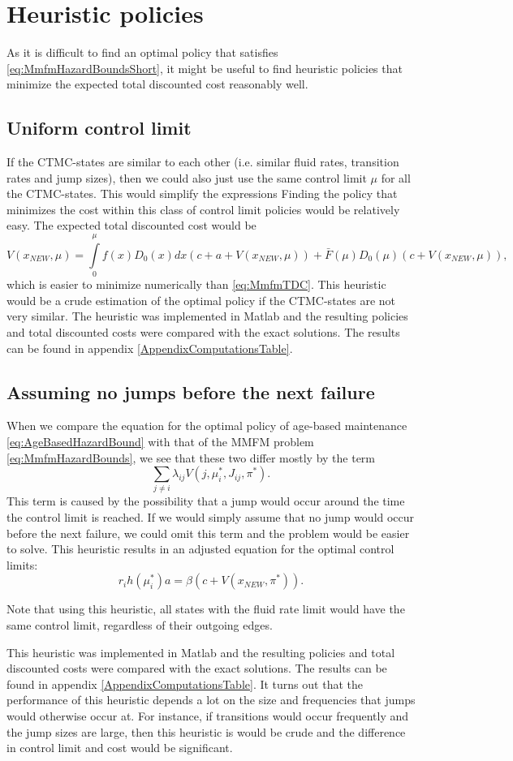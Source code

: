 \section{Heuristic policies}\label{section:MmfmHeuristics}
As it is difficult to find an optimal policy that satisfies \eqref{eq:MmfmHazardBoundsShort}, it might be useful to find heuristic policies that minimize the expected total discounted cost reasonably well.

\subsection{Uniform control limit}
If the CTMC-states are similar to each other (i.e. similar fluid rates, transition rates and jump sizes), then we could also just use the same control limit $\mu$ for all the CTMC-states.
This would simplify the expressions 
Finding the policy that minimizes the cost within this class of control limit policies would be relatively easy.
The expected total discounted cost would be
\[
V(x_{NEW},\mu)=\int\limits_0^\mu f(x)D_0(x)dx (c+a+V(x_{NEW},\mu))+\bar{F}(\mu)D_0(\mu)(c+V(x_{NEW},\mu)),
\]
which is easier to minimize numerically than \eqref{eq:MmfmTDC}.
This heuristic would be a crude estimation of the optimal policy if the  CTMC-states are not very similar. 
The heuristic was implemented in Matlab and the resulting policies and total discounted costs were compared with the exact solutions.
The results can be found in appendix \ref{AppendixComputationsTable}.

\subsection{Assuming no jumps before the next failure}
When we compare the equation for the optimal policy of age-based maintenance \eqref{eq:AgeBasedHazardBound} with that of the MMFM problem \eqref{eq:MmfmHazardBounds},
we see that these two differ mostly by the term 
\[
\sum\limits_{j\neq i}\lambda_{ij}V(j,\mu_i^*,J_{ij},\pi^*).
\]
This term is caused by the possibility that a jump would occur around the time the control limit is reached.
If we would simply assume that no jump would occur before the next failure, we could omit this term and the problem would be easier to solve.
This heuristic results in an adjusted equation for the optimal control limits:
\[
r_ih(\mu_i^*)a=\beta(c+V(x_{NEW},\pi^*)).
\]
\begin{remark}
	Note that using this heuristic, all states with the fluid rate limit would have the same control limit, regardless of their outgoing edges.
\end{remark}
This heuristic was implemented in Matlab and the resulting policies and total discounted costs were compared with the exact solutions.
The results can be found in appendix \ref{AppendixComputationsTable}.
It turns out that the performance of this heuristic depends a lot on the size and frequencies that jumps would otherwise occur at.
For instance, if transitions would occur frequently and the jump sizes are large, then this heuristic is would be crude and the difference in control limit and cost would be significant.